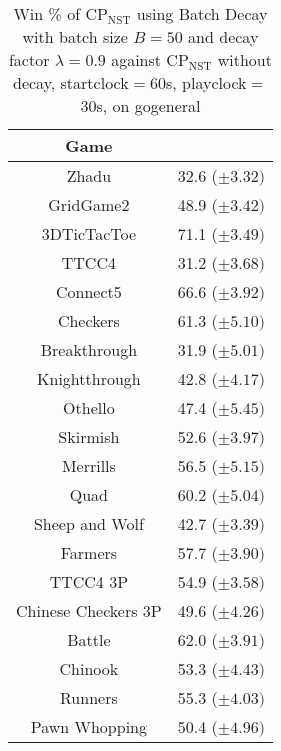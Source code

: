 \documentclass[journal]{IEEEtran}
\begin{document}
\begin{table}[h!]
\caption{Win \%  of CP$_{\textrm{NST}}$ using Batch Decay with batch size $B=50$ and decay factor $\lambda=0.9$ against CP$_{\textrm{NST}}$ without decay, startclock$=$60s, playclock$=$30s, on gogeneral}
\label{table:batchDecayFinal}
\centering
\begin{tabular}{|c|c|}
\hline
 \textbf{Game} & \\
\hline\hline
Zhadu & 32.6 ($\pm 3.32)$  \\ 
GridGame2 & 48.9 ($\pm 3.42)$   \\ 
3DTicTacToe & 71.1 ($\pm 3.49)$   \\ 
TTCC4 & 31.2 ($\pm 3.68)$  \\ 
Connect5 & 66.6 ($\pm 3.92)$   \\ 
Checkers & 61.3 ($\pm 5.10)$    \\ 
Breakthrough & 31.9 ($\pm 5.01)$    \\ 
Knightthrough & 42.8 ($\pm 4.17)$    \\ 
Othello & 47.4 ($\pm 5.45)$    \\ 
Skirmish & 52.6 ($\pm 3.97)$   \\ 
Merrills & 56.5 ($\pm 5.15)$   \\ 
Quad & 60.2 ($\pm 5.04)$ \\ 
Sheep and Wolf & 42.7 ($\pm 3.39)$ \\ 
\hline
Farmers & 57.7 ($\pm 3.90)$  \\ 
TTCC4 3P & 54.9 ($\pm 3.58)$  \\ 
Chinese Checkers 3P & 49.6 ($\pm 4.26)$ \\ 
\hline
Battle & 62.0 ($\pm 3.91)$  \\ 
Chinook & 53.3 ($\pm 4.43)$   \\ 
Runners & 55.3 ($\pm 4.03)$ \\ 
Pawn Whopping & 50.4 ($\pm 4.96)$  \\ \hline
\end{tabular}
\end{table}
\end{document}
